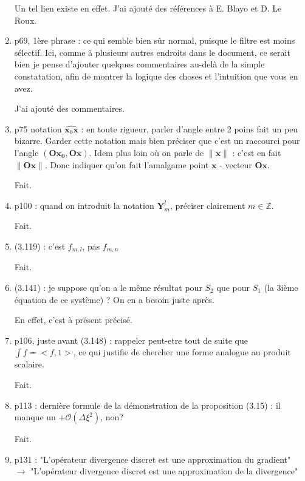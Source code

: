 \documentclass[10pt,a4paper]{article}
\begin{document}
\begin{enumerate}
{\color{blue} Un tel lien existe en effet. J'ai ajouté des références à E. Blayo et D. Le Roux.} 


\item p69, 1ère phrase : ce qui semble bien sûr normal, puisque le filtre est moins sélectif. Ici, comme à plusieurs autres endroits dans le document, ce serait bien je pense d'ajouter quelques commentaires au-delà de la simple constatation, afin de montrer la logique des choses et l'intuition que vous en avez.

{\color{blue} J'ai ajouté des commentaires.} 


\item p75 notation $\widehat{\mathbf{x}_0 \mathbf{x}}$ : en toute rigueur, parler d'angle entre 2 poins fait un peu bizarre. Garder cette notation mais bien préciser que c'est un raccourci pour l'angle $(\mathbf{Ox_0}, \mathbf{Ox})$. Idem plus loin où on parle de $\| \mathbf{x} \|$ : c'est en fait $\| \mathbf{Ox} \|$. Donc indiquer qu'on fait l'amalgame point $\mathbf{x}$ - vecteur $\mathbf{Ox}$.

{\color{blue} Fait.} 

\item p100 : quand on introduit la notation $\mathbf{Y}_m^l$, préciser clairement $m \in \mathbb{Z}$.

{\color{blue} Fait.} 


\item (3.119) : c'est $f_{m,l}$, pas $f_{m,n}$

{\color{blue} Fait.} 

\item (3.141) : je suppose qu'on a le même résultat pour $S_2$ que pour $S_1$ (la 3ième équation de ce système) ? On en a besoin juste après.

{\color{blue} En effet, c'est à présent précisé.} 

\item p106, juste avant (3.148) : rappeler peut-etre tout de suite que $\int f = <f,1>$, ce qui justifie de chercher une forme analogue au produit scalaire.

{\color{blue} Fait.} 


\item p113 : dernière formule de la démonstration de la proposition (3.15) : il manque un $+ \mathcal{O}(\Delta \xi^2)$, non?

{\color{blue} Fait.} 

\item p131 : "L'opérateur divergence discret est une approximation du gradient" $\rightarrow$ "L'opérateur divergence discret est une approximation de la divergence"


\end{enumerate}
\end{document}
